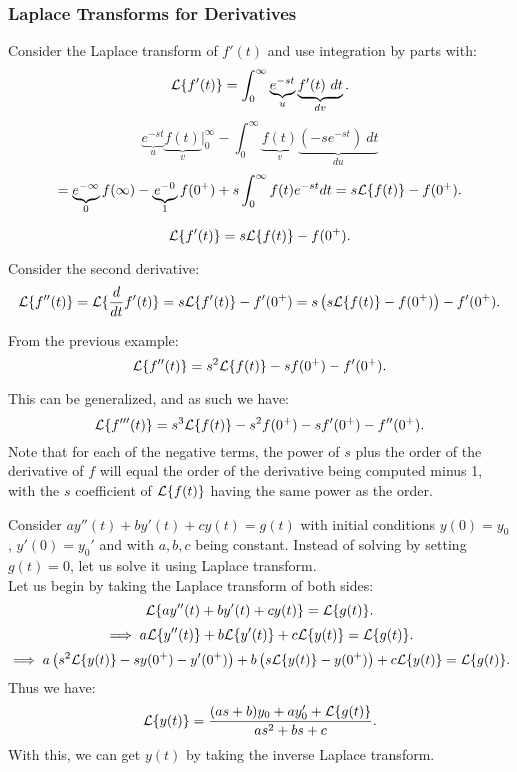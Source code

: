 \documentclass[../main/main.tex]{subfiles}
\begin{document}
\subsubsection{Laplace Transforms for Derivatives}
Consider the Laplace transform of $f'(t)$ and use integration by parts with: \[
	\mathcal{L}\{f'(t)\} = \int^\infty_0 \underbrace{e^{-st}}_u \underbrace{f'(t)~dt}_{dv}
.\] \[
\underbrace{e^{-st}}_u\underbrace{f(t)}_v\bigg\rvert^\infty_0 - \int^\infty_0 \underbrace{f(t)}_v\underbrace{(-s e^{-st})~dt}_{du}  \]\[=\underbrace{e^{-\infty}}_0f(\infty) - \underbrace{e^{-0}}_1f(0^+) + s\int^\infty_0 f(t) e^{-st}dt = s\mathcal{L} \{f(t)\} -f(0^+)
.\] 
\begin{theorem}
	\[
		\mathcal{L} \{f'(t)\} = s\mathcal{L} \{f(t)\} -f(0^{+}) 
	.\] 
	
\end{theorem}
\begin{example}
	Consider the second derivative: \[
		\mathcal{L} \{f''(t)\} = \mathcal{L} \{\frac{d}{dt}f'(t)\} =s\mathcal{L} \{f'(t)\} -f'(0^{+}) = s\left( s\mathcal{L} \{f(t)\} -f(0^+) \right) -f'(0^{+})
	.\] 
\end{example}
\begin{theorem}
	From the previous example: \[
		\mathcal{L} \{f''(t)\} = s^2\mathcal{L} \{f(t) \} -sf(0^+) -f'(0^+)
	.\] 
\end{theorem}
\begin{remark}
	This can be generalized, and as such we have: \[
		\mathcal{L} \{f'''(t)\} = s^{3}\mathcal{L} \{f(t)\} -s^2f(0^+)-sf'(0^+)-f''(0^+)	
	.\] Note that for each of the negative terms, the power of $s$ plus the order of the derivative of $f$ will equal the order of the derivative being computed minus 1, with the $s$ coefficient of $\mathcal{L} \{f(t)\} $ having the same power as the order.
\end{remark}
	Consider $ay''(t) + by'(t) + cy(t) = g(t)$  with initial conditions  $y(0) = y_0$, $y'(0) = y_0'$ and with $a,b,c$ being constant. Instead of solving by setting $g(t)=0 $, let us solve it using Laplace transform.\\
Let us begin by taking the Laplace transform of both sides: \[
	\mathcal{L} \{ay''(t) + by'(t) + cy(t)\} =\mathcal{L} \{g(t)\} 
.\] \[
\implies a\mathcal{L} \{y''(t)\} +b \mathcal{L} \{y'(t)\} +c\mathcal{L} \{y(t) \} = \mathcal{L} \{g(t)\} 
.\] \[
\implies a\large\left( s^2\mathcal{L} \{y(t)\} -sy(0^+)-y'(0^+) \large\right) +b\left( s\mathcal{L} \{y(t)\} -y(0^+) \right) +c\mathcal{L} \{y(t)\}  = \mathcal{L} \{g(t)\} 
.\] Thus we have: \[
\mathcal{L} \{y(t)\} = \frac{(as+b)y_0+ay_0'+\mathcal{L} \{g(t)\} }{as^2+bs+c}
.\] With this, we can get $y(t)$ by taking the inverse Laplace transform.
\end{document}

